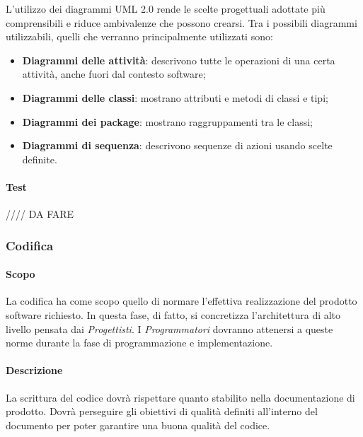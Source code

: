 L'utilizzo dei diagrammi UML 2.0 rende le scelte progettuali adottate più comprensibili e riduce ambivalenze che possono crearsi.  Tra i possibili diagrammi utilizzabili,  quelli che verranno principalmente utilizzati sono:
\begin{itemize}

\item \textbf{Diagrammi delle attività}: descrivono tutte le operazioni di una certa attività,  anche fuori dal contesto software;

\item \textbf{Diagrammi delle classi}: mostrano attributi e metodi di classi e tipi;

\item \textbf{Diagrammi dei package}: mostrano raggruppamenti tra le classi;

\item \textbf{Diagrammi di sequenza}: descrivono sequenze di azioni usando scelte definite.

\end{itemize}

\paragraph{Test}

//// DA FARE


\subsubsection{Codifica}

\paragraph{Scopo}

La codifica ha come scopo quello di normare l'effettiva realizzazione del prodotto software richiesto.  In questa fase,  di fatto, si concretizza l'architettura di alto livello pensata dai \textit{Progettisti}.  I \textit{Programmatori} dovranno attenersi a queste norme durante la fase di programmazione e implementazione.

\paragraph{Descrizione}

La scrittura del codice dovrà rispettare quanto stabilito nella documentazione di prodotto.  Dovrà perseguire gli obiettivi di qualità definiti all'interno del documento \PdQ  per poter garantire una buona qualità del codice.

